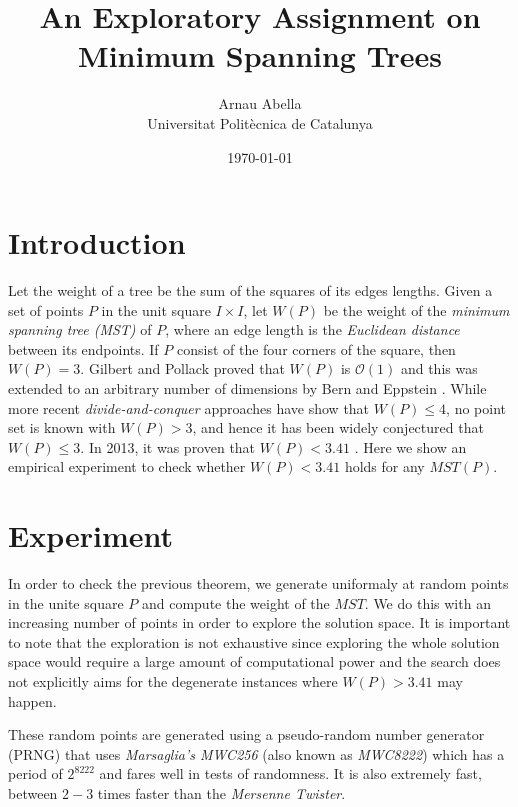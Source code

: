 \documentclass[12pt, a4paper]{article}
\title{%
  \vspace{-10ex}
  An Exploratory Assignment on Minimum Spanning Trees
}
\author{%
  Arnau Abella \\
  \large{Universitat Polit\`ecnica de Catalunya}
}
\date{\today}
\begin{document}
\maketitle


\vspace{5ex}

\section{Introduction}\label{sec:1}

Let the weight of a tree be the sum of the squares of its edges lengths. Given a set of points $P$ in the unit square $I \times I$, let $W(P)$ be the weight of the \textit{minimum spanning tree (MST)} of $P$, where an edge length is the \textit{Euclidean distance} between its endpoints. If $P$ consist of the four corners of the square, then $W(P) = 3$. Gilbert and Pollack \cite{gil68} proved that $W(P)$ is $\mathcal{O}(1)$ and this was extended to an arbitrary number of dimensions by Bern and Eppstein \cite{bern93}. While more recent \textit{divide-and-conquer} approaches have show that $W(P) \leq 4$, no point set is known with $W(P) > 3$, and hence it has been widely conjectured that $W(P) \leq 3$. In 2013, it was proven that $W(P) < 3.41$ \cite{aichholzer2013sum}. Here we show an empirical experiment to check whether $W(P) < 3.41$ holds for any $MST(P)$.

\section{Experiment}\label{sec:2}

In order to check the previous theorem, we generate uniformaly at random points in the unite square $P$ and compute the weight of the $MST$. We do this with an increasing number of points in order to explore the solution space. It is important to note that the exploration is not exhaustive since exploring the whole solution space would require a large amount of computational power and the search does not explicitly aims for the degenerate instances where $W(P) > 3.41$ may happen.

These random points are generated using a pseudo-random number generator (PRNG) that uses \textit{Marsaglia's MWC256} (also known as \textit{MWC8222}) which has a period of $2^{8222}$ and fares well in tests of randomness. It is also extremely fast, between $2-3$ times faster than the \textit{Mersenne Twister}.
\end{document}
